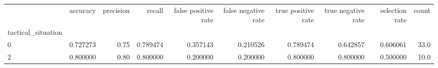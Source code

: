\begin{tabular}{lrrrrrrrrr}
\toprule
{} &  accuracy &  precision &    recall &  false positive rate &  false negative rate &  true positive rate &  true negative rate &  selection rate &  count \\
tactical\_situation &           &            &           &                      &                      &                     &                     &                 &        \\
\midrule
0                  &  0.727273 &       0.75 &  0.789474 &             0.357143 &             0.210526 &            0.789474 &            0.642857 &        0.606061 &   33.0 \\
2                  &  0.800000 &       0.80 &  0.800000 &             0.200000 &             0.200000 &            0.800000 &            0.800000 &        0.500000 &   10.0 \\
\bottomrule
\end{tabular}
